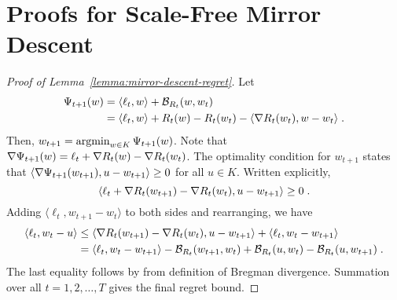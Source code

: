 \section{Proofs for Scale-Free Mirror Descent}
\label{section:mirror-descent-proofs}

\begin{proof}[Proof of Lemma~\ref{lemma:mirror-descent-regret}]
Let
\begin{align*}
\Psi_{t+1}(w)
& = \langle \ell_t, w \rangle + \mathcal{B}_{R_t}(w,w_t) \\
& = \langle \ell_t, w \rangle + R_t(w) - R_t(w_t) - \langle \nabla R_t(w_t) , w - w_t \rangle \; .
\end{align*}
Then, $w_{t+1} = \operatorname*{argmin}_{w \in K} \Psi_{t+1}(w)$. Note that $\nabla
\Psi_{t+1}(w) = \ell_t + \nabla R_t(w) - \nabla R_t(w_t)$. The optimality
condition for $w_{t+1}$ states that $\langle \nabla \Psi_{t+1}(w_{t+1}), u -
w_{t+1} \rangle \ge 0$ for all $u \in K$. Written explicitly,
$$
\langle \ell_t + \nabla R_t(w_{t+1}) - \nabla R_t(w_t), u - w_{t+1} \rangle \ge 0 \; .
$$
Adding $\langle \ell_t, w_{t+1} - w_t \rangle$ to both sides and rearranging,
we have
\begin{align*}
\langle \ell_t, w_t - u \rangle
& \le \langle \nabla R_t(w_{t+1}) - \nabla R_t(w_t), u - w_{t+1} \rangle  + \langle \ell_t, w_t - w_{t+1} \rangle \\
& = \langle \ell_t, w_t - w_{t+1} \rangle - \mathcal{B}_{R_t}(w_{t+1}, w_t) + \mathcal{B}_{R_t}(u,w_t) - \mathcal{B}_{R_t}(u, w_{t+1}) \; .
\end{align*}
The last equality follows by from definition of Bregman divergence.  Summation
over all $t=1,2,\dots,T$ gives the final regret bound.
\end{proof}

